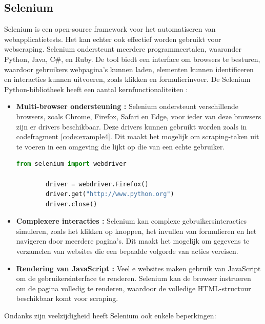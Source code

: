 \subsection{Selenium}
Selenium is een open-source framework voor het automatiseren van webapplicatietests. Het kan echter ook effectief worden gebruikt voor webscraping. Selenium ondersteunt meerdere programmeertalen, waaronder Python, Java, C#, en Ruby. De tool biedt een interface om browsers te besturen, waardoor gebruikers webpagina's kunnen laden, elementen kunnen identificeren en interacties kunnen uitvoeren, zoals klikken en formulierinvoer. De Selenium Python-bibliotheek heeft een aantal kernfunctionaliteiten \autocite{Muthukadan2011}:

\begin{itemize}
    \item \textbf{Multi-browser ondersteuning :} Selenium ondersteunt verschillende browsers, zoals Chrome, Firefox, Safari en Edge, voor ieder van deze browsers zijn er drivers beschikbaar. Deze drivers kunnen gebruikt worden zoals in codefragment \ref{code:example4}. Dit maakt het mogelijk om scraping-taken uit te voeren in een omgeving die lijkt op die van een echte gebruiker.

    \begin{lstlisting}[language=Python, caption={voorbeeld Selenium driver}, captionpos=b, label=code:example4]
        from selenium import webdriver

        driver = webdriver.Firefox()
        driver.get("http://www.python.org")
        driver.close()
    \end{lstlisting}

    \item \textbf{Complexere interacties :} Selenium kan complexe gebruikersinteracties simuleren, zoals het klikken op knoppen, het invullen van formulieren en het navigeren door meerdere pagina's. Dit maakt het mogelijk om gegevens te verzamelen van websites die een bepaalde volgorde van acties vereisen.

    \item \textbf{Rendering van JavaScript :} Veel e websites maken gebruik van JavaScript om de gebruikersinterface te renderen. Selenium kan de browser instrueren om de pagina volledig te renderen, waardoor de volledige HTML-structuur beschikbaar komt voor scraping.

\end{itemize}

Ondanks zijn veelzijdigheid heeft Selenium ook enkele beperkingen:

